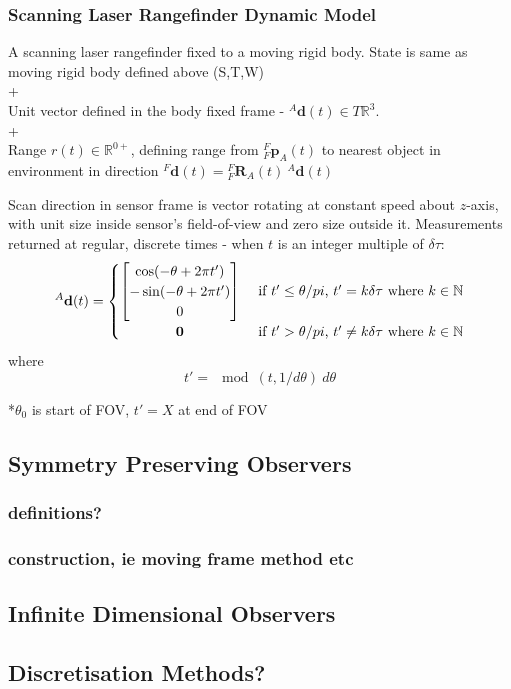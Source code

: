 	\subsubsection{Scanning Laser Rangefinder Dynamic Model}
		A scanning laser rangefinder fixed to a moving rigid body. State is same as moving rigid body defined above (S,T,W)\\+\\
		Unit vector defined in the body fixed frame  - ${^{A}\mathbf{d}(t)} \in T\mathbb{R}^3$.\\+\\
		Range $r(t) \in \mathbb{R}^{0+}$, defining range from $^{F}_{F}\mathbf{p}^{}_{A}(t)$ to nearest object in environment in direction ${^{F}\mathbf{d}(t)} = {^{F}_{F}\mathbf{R}^{}_{A}(t)}\:{^{A}\mathbf{d}(t)}$
		
		Scan direction in sensor frame is vector rotating at constant speed about $z$-axis, with unit size inside sensor's field-of-view and zero size outside it. Measurements returned at regular, discrete times - when $t$ is an integer multiple of $\delta\tau$:
		\begin{equation}
		^{A}\mathbf{d}(t) =
			\begin{cases} 
			      \hfill \begin{bmatrix}
			      		\cos(-\theta + 2\pi t') \\
			      		-\sin(-\theta + 2\pi t') \\
			      		0
			      	\end{bmatrix}    \hfill & \text{ if $t' \leq \theta/pi$, $t' = k\delta\tau$ where $k \in \mathbb{N}$} \\
			      \hfill \mathbf{0} \hfill & \text{ if $t' > \theta/pi$, $t' \neq k\delta\tau$ where $k \in \mathbb{N}$} \\
			\end{cases} 
		\end{equation}
		where
		\begin{equation}
		t' = \mod(t,1/d\theta)\:d\theta
		\end{equation}
		
		*$\theta_0$ is start of FOV, $t'=X$ at end of FOV

\subsection{Symmetry Preserving Observers}
	\subsubsection{definitions?}
	\subsubsection{construction, ie moving frame method etc}
\subsection{Infinite Dimensional Observers}
\subsection{Discretisation Methods?}